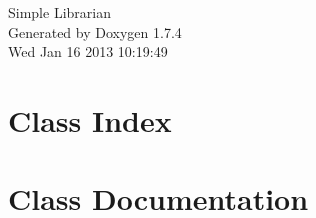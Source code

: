 \documentclass[a4paper]{book}
\begin{document}
\hypersetup{pageanchor=false}
\begin{titlepage}
\vspace*{7cm}
\begin{center}
{\Large Simple Librarian }\\
\vspace*{1cm}
{\large Generated by Doxygen 1.7.4}\\
\vspace*{0.5cm}
{\small Wed Jan 16 2013 10:19:49}\\
\end{center}
\end{titlepage}
\clearemptydoublepage
{}
\tableofcontents
\clearemptydoublepage
{}
\hypersetup{pageanchor=true}
\chapter{Class Index}

\chapter{Class Documentation}





















\printindex
\end{document}
